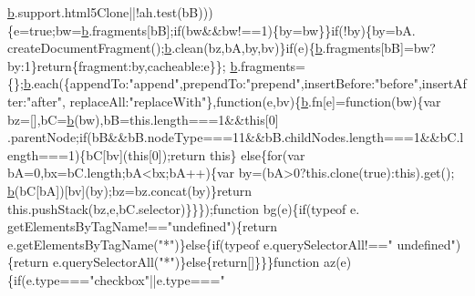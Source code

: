 \begin{DoxyCode}
      \hyperlink{docs_2_programmer's_manual_2html_2jquery_8js_aa4026ad5544b958e54ce5e106fa1c805}{b}.support.html5Clone||!ah.test(bB)))\{e=\textcolor{keyword}{true};bw=\hyperlink{docs_2_programmer's_manual_2html_2jquery_8js_aa4026ad5544b958e54ce5e106fa1c805}{b}.fragments[bB];\textcolor{keywordflow}{if}(bw&&bw!==1)\{by=bw\}\}\textcolor{keywordflow}{if}(!by)\{by=bA.
      createDocumentFragment();\hyperlink{docs_2_programmer's_manual_2html_2jquery_8js_aa4026ad5544b958e54ce5e106fa1c805}{b}.clean(bz,bA,by,bv)\}\textcolor{keywordflow}{if}(e)\{\hyperlink{docs_2_programmer's_manual_2html_2jquery_8js_aa4026ad5544b958e54ce5e106fa1c805}{b}.fragments[bB]=bw?by:1\}\textcolor{keywordflow}{return}\{fragment:by,cacheable:e\}\};
      \hyperlink{docs_2_programmer's_manual_2html_2jquery_8js_aa4026ad5544b958e54ce5e106fa1c805}{b}.fragments=\{\};\hyperlink{docs_2_programmer's_manual_2html_2jquery_8js_aa4026ad5544b958e54ce5e106fa1c805}{b}.each(\{appendTo:\textcolor{stringliteral}{"append"},prependTo:\textcolor{stringliteral}{"prepend"},insertBefore:\textcolor{stringliteral}{"before"},insertAfter:\textcolor{stringliteral}{"after"},
      replaceAll:\textcolor{stringliteral}{"replaceWith"}\},\textcolor{keyword}{function}(e,bv)\{\hyperlink{docs_2_programmer's_manual_2html_2jquery_8js_aa4026ad5544b958e54ce5e106fa1c805}{b}.fn[e]=\textcolor{keyword}{function}(bw)\{var bz=[],bC=\hyperlink{docs_2_programmer's_manual_2html_2jquery_8js_aa4026ad5544b958e54ce5e106fa1c805}{b}(bw),bB=this.length===1&&\textcolor{keyword}{this}[0]
      .parentNode;\textcolor{keywordflow}{if}(bB&&bB.nodeType===11&&bB.childNodes.length===1&&bC.length===1)\{bC[bv](\textcolor{keyword}{this}[0]);\textcolor{keywordflow}{return} \textcolor{keyword}{this}\}\textcolor{keywordflow}{
      else}\{\textcolor{keywordflow}{for}(var bA=0,bx=bC.length;bA<bx;bA++)\{var by=(bA>0?this.clone(\textcolor{keyword}{true}):this).get();
      \hyperlink{docs_2_programmer's_manual_2html_2jquery_8js_aa4026ad5544b958e54ce5e106fa1c805}{b}(bC[bA])[bv](by);bz=bz.concat(by)\}\textcolor{keywordflow}{return} this.pushStack(bz,e,bC.selector)\}\}\});\textcolor{keyword}{function} bg(e)\{\textcolor{keywordflow}{if}(typeof e.
      getElementsByTagName!==\textcolor{stringliteral}{"undefined"})\{\textcolor{keywordflow}{return} e.getElementsByTagName(\textcolor{stringliteral}{"*"})\}\textcolor{keywordflow}{else}\{\textcolor{keywordflow}{if}(typeof e.querySelectorAll!==\textcolor{stringliteral}{"
      undefined"})\{\textcolor{keywordflow}{return} e.querySelectorAll(\textcolor{stringliteral}{"*"})\}\textcolor{keywordflow}{else}\{\textcolor{keywordflow}{return}[]\}\}\}\textcolor{keyword}{function} az(e)\{\textcolor{keywordflow}{if}(e.type===\textcolor{stringliteral}{"checkbox"}||e.type===\textcolor{stringliteral}{"
}
\end{DoxyCode}

